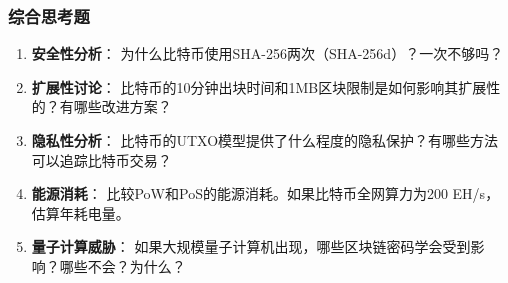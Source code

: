 ﻿\documentclass[12pt,a4paper]{article}
\begin{document}
\subsubsection{综合思考题}

\begin{enumerate}[leftmargin=1.5em]
\item \textbf{安全性分析}：
为什么比特币使用SHA-256两次（SHA-256d）？一次不够吗？

\item \textbf{扩展性讨论}：
比特币的10分钟出块时间和1MB区块限制是如何影响其扩展性的？有哪些改进方案？

\item \textbf{隐私性分析}：
比特币的UTXO模型提供了什么程度的隐私保护？有哪些方法可以追踪比特币交易？

\item \textbf{能源消耗}：
比较PoW和PoS的能源消耗。如果比特币全网算力为200 EH/s，估算年耗电量。

\item \textbf{量子计算威胁}：
如果大规模量子计算机出现，哪些区块链密码学会受到影响？哪些不会？为什么？
\end{enumerate}
\end{document}
